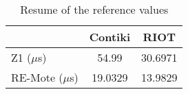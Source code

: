 \begin{table}[!ht]
  \centering
  \begin{tabular}{l|c|c}
                   & Contiki & RIOT    \\ \hline
  Z1 ($\mu$s)      & 54.99   & 30.6971 \\
  RE-Mote ($\mu$s) & 19.0329 & 13.9829
  \end{tabular}
  \caption{Resume of the reference values}
  \label{tab:reference-values-resume}
  \end{table}